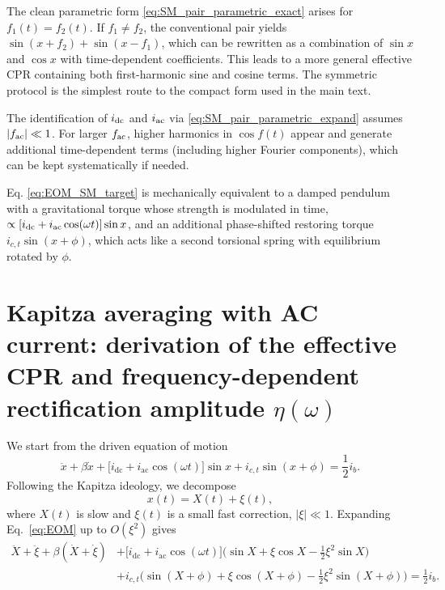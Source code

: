 \documentclass[prl,twocolumn,superscriptaddress,showpacs,nofootinbib]{revtex4-2}
\begin{document}
The clean parametric form \eqref{eq:SM_pair_parametric_exact} arises for $f_1(t)=f_2(t)$. If $f_1\neq f_2$, the conventional pair yields
$\sin(x+f_2)+\sin(x-f_1)$, which can be rewritten as a combination of $\sin x$ and $\cos x$ with time-dependent coefficients. This leads to a more general effective CPR containing both first-harmonic sine and cosine terms. The symmetric protocol is the simplest route to the compact form used in the main text.


The identification of $i_{\rm dc}$ and $i_{\rm ac}$ via \eqref{eq:SM_pair_parametric_expand} assumes $|f_{\rm ac}|\ll 1$. For larger $f_{\rm ac}$, higher harmonics in $\cos f(t)$ appear and generate additional time-dependent terms (including higher Fourier components), which can be kept systematically if needed.


Eq. \eqref{eq:EOM_SM_target} is mechanically equivalent to a damped pendulum with a gravitational torque whose strength is modulated in time, $\propto [i_{\rm dc}+i_{\rm ac}\cos(\omega t)]\sin x$, and an additional phase-shifted restoring torque $i_{c,t}\sin(x+\phi)$, which acts like a second torsional spring with equilibrium rotated by $\phi$.


\section{Kapitza averaging with AC current: derivation of the effective CPR and frequency-dependent rectification amplitude $\eta(\omega)$}

We start from the driven equation of motion
\begin{equation}
\ddot x + \beta \dot x
+ \big[i_{\mathrm{dc}}+i_{\mathrm{ac}}\cos(\omega t)\big]\sin x
+ i_{c,t}\sin(x+\phi)
= \frac{1}{2}i_b .
\label{eq:EOM}
\end{equation}
Following the Kapitza ideology, we decompose
\begin{equation}
x(t)=X(t)+\xi(t),
\end{equation}
where $X(t)$ is slow and $\xi(t)$ is a small fast correction, $|\xi|\ll 1$.
Expanding Eq.~\eqref{eq:EOM} up to $O(\xi^2)$ gives
\begin{align}
\ddot X+\ddot \xi + \beta(\dot X+\dot \xi)
&+ \big[i_{\mathrm{dc}}+i_{\mathrm{ac}}\cos(\omega t)\big]
\Big(\sin X + \xi \cos X -\tfrac{1}{2}\xi^2\sin X\Big)
\nonumber\\
&+ i_{c,t}\Big(\sin(X+\phi)+\xi\cos(X+\phi)-\tfrac{1}{2}\xi^2\sin(X+\phi)\Big)
=\frac{1}{2}i_b.
\label{eq:expanded2}
\end{align}
\end{document}
